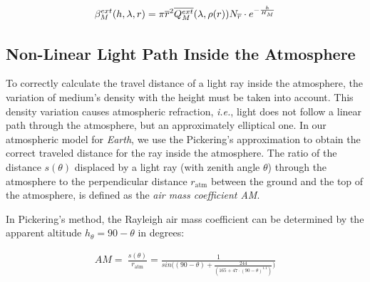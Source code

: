 \documentclass[journal]{vgtc}                %
\begin{document}
\vspace*{-1.5mm}
\begin{equation}\label{eq:final_mie_ext}
  \small
  \beta_M^{ext}(h, \lambda, r) = \pi {\overline{r}}^2 \overline{Q_{M}^{ext}}(\lambda, \rho(r))N_{\overline{r}} \cdot e^{-\frac{h}{H_M}}
\end{equation}
\vspace*{-4.5mm}

\subsection{Non-Linear Light Path Inside the Atmosphere}\label{section:nlp}

To correctly calculate the travel distance of a light ray inside the atmosphere, the variation of medium's density with the height must be taken into account. This density variation causes atmospheric refraction, \textit{i.e.}, light does not follow a linear path through the atmosphere, but an approximately elliptical one. In our atmospheric model for \textit{Earth}, we use the Pickering's approximation \cite{Pickering:2002} to obtain the correct traveled distance for the ray inside the atmosphere. The ratio of the distance $s(\theta)$ displaced by a light ray (with zenith angle $\theta$) through the atmosphere to the perpendicular distance $r_{\text{atm}}$ between the ground and the top of the atmosphere, is defined as the \textit{air mass coefficient AM}.



In Pickering's method, the Rayleigh air mass coefficient can be determined by the apparent altitude $h_\theta = 90 - \theta$ in degrees:

\vspace*{-3mm}
{
  \small
\begin{align} \label{eq:airmass}
AM =\ \frac{s(\theta)}{r_{\text{atm}}} = \frac{1}{sin\Big((90 - \theta) + \frac{244}{(165 + 47\cdot(90 - \theta)^{1.1})}\Big)}
\end{align}
}
\vspace*{-3mm}
\end{document}
